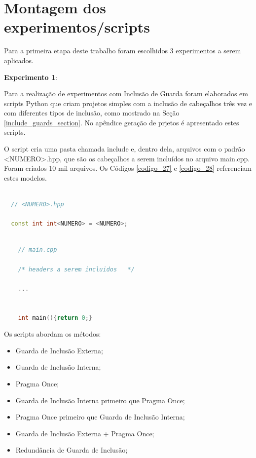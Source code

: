 \section{Montagem dos experimentos/scripts}

Para a primeira etapa deste trabalho foram escolhidos 3 experimentos a
 serem aplicados.

\textbf{Experimento 1}:\label{experimento_1}

Para a realização de experimentos com Inclusão de Guarda foram elaborados
 em scripts Python que criam projetos simples com a inclusão de cabeçalhos
 três vez e com diferentes tipos de inclusão, como mostrado na  Seção
 \ref{include_guards_section}.
 No apêndice geração de prjetos é apresentado estes scripts.

O script cria uma pasta chamada include e, dentro dela, arquivos com o padrão
 <NUMERO>.hpp, que são os cabeçalhos a serem incluídos no arquivo main.cpp.
 Foram criados 10 mil arquivos. Os Códigos \ref{codigo_27} e  \ref{codigo_28}
 referenciam estes modelos.



\begin{lstlisting}[language=C++,frame=single,captionpos=b,caption={Modelo de
									 Arquivo .hpp gerado pelos scripts de 
									  guardas de inclusão},
                                                   label=codigo_27]

  // <NUMERO>.hpp

  const int int<NUMERO> = <NUMERO>;

\end{lstlisting}



\begin{lstlisting}[language=C++,frame=single,captionpos=b,caption={Modelo de
                               Arquivo main.cpp criado pelos scripts de
                                                     guardas de inclusão},
                                                          label=codigo_28]

    // main.cpp

    /* headers a serem incluidos   */

    ...


    int main(){return 0;}

\end{lstlisting}




Os scripts abordam os métodos:

\begin{itemize}
	\item Guarda de Inclusão Externa;
	\item Guarda de Inclusão Interna;
	\item Pragma Once;
	\item Guarda de Inclusão Interna primeiro que Pragma Once;
	\item Pragma Once primeiro que  Guarda de Inclusão Interna;
	\item Guarda de Inclusão Externa + Pragma Once;
	\item Redundância de Guarda de Inclusão;
\end{itemize}


